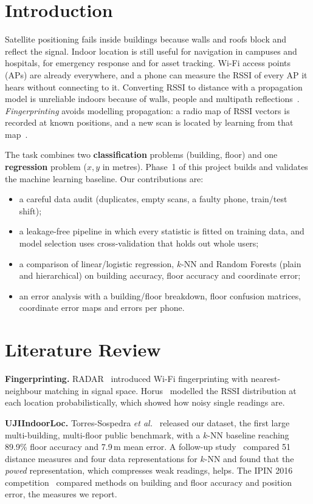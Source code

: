 \documentclass[conference]{IEEEtran}
\begin{document}
\section{Introduction}
Satellite positioning fails inside buildings because walls and roofs block and reflect the signal.
Indoor location is still useful for navigation in campuses and hospitals, for emergency response and for asset
tracking. Wi-Fi access points (APs) are already everywhere, and a phone can measure the RSSI of every AP it
hears without connecting to it. Converting RSSI to distance with a propagation model is unreliable
indoors because of walls, people and multipath reflections~\cite{zafari2019survey}. \emph{Fingerprinting}
avoids modelling propagation: a radio map of RSSI vectors is recorded at known positions, and a new scan is
located by learning from that map~\cite{bahl2000radar}.

The task combines two \textbf{classification} problems (building, floor) and one \textbf{regression}
problem ($x,y$ in metres). Phase~1 of this project builds and validates the machine learning
baseline. Our contributions are:
\begin{itemize}
\item a careful data audit (duplicates, empty scans, a faulty phone, train/test shift);
\item a leakage-free pipeline in which every statistic is fitted on training data, and model
selection uses cross-validation that holds out whole users;
\item a comparison of linear/logistic regression, $k$-NN and Random Forests (plain and hierarchical) on
building accuracy, floor accuracy and coordinate error;
\item an error analysis with a building/floor breakdown, floor confusion matrices, coordinate error maps and
errors per phone.
\end{itemize}

\section{Literature Review}
\textbf{Fingerprinting.} RADAR~\cite{bahl2000radar} introduced Wi-Fi fingerprinting with nearest-neighbour
matching in signal space. Horus~\cite{youssef2005horus} modelled the RSSI distribution at each location
probabilistically, which showed how noisy single readings are.

\textbf{UJIIndoorLoc.} Torres-Sospedra \emph{et al.}~\cite{torres2014uji} released our dataset, the first
large multi-building, multi-floor public benchmark, with a $k$-NN baseline reaching 89.9\% floor accuracy
and 7.9\,m mean error. A follow-up study~\cite{torres2015distance} compared 51 distance measures and four data
representations for $k$-NN and found that the \emph{powed} representation, which compresses weak readings,
helps. The IPIN 2016 competition~\cite{torres2017ipin} compared methods on building and floor accuracy and position error, the measures we report.
\end{document}
